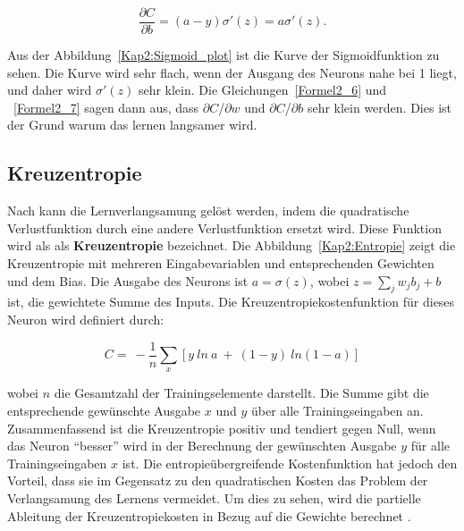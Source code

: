         \begin{equation} \label{Formel2_7}
            \frac{\partial C}{\partial b} =( a-y) \sigma '( z) =a\sigma '( z).
        \end{equation}
        
        Aus der Abbildung~\ref{Kap2:Sigmoid_plot} ist die Kurve der Sigmoidfunktion zu sehen. Die Kurve wird sehr flach, wenn der Ausgang des Neurons nahe bei 1 liegt, und daher wird $\sigma'(z)$ sehr klein. Die Gleichungen~\ref{Formel2_6} und ~\ref{Formel2_7} sagen dann aus, dass $\partial$$C$/$\partial$$w$  und  $\partial$$C$/$\partial$$b$ sehr klein werden. Dies ist der Grund warum das lernen langsamer wird.

    \subsection{Kreuzentropie}
    Nach \cite*[62]{Nielsen2015} kann die Lernverlangsamung gelöst werden, indem die quadratische Verlustfunktion durch eine andere Verlustfunktion ersetzt wird. Diese Funktion wird als als \textbf{Kreuzentropie} bezeichnet. Die Abbildung~\ref{Kap2:Entropie} zeigt die Kreuzentropie mit mehreren Eingabevariablen und entsprechenden Gewichten und dem Bias. Die Ausgabe des Neurons ist $a = \sigma(z)$, wobei $z =  \sum _{j} w_{j} b_{j} + b$ ist, die gewichtete Summe des Inputs. Die Kreuzentropiekostenfunktion für dieses Neuron wird definiert durch:

    \begin{equation} \label{Formel2_8}
        C=\ -\frac{1}{n}\sum _{x}[ y\ ln\ a\ +\ ( 1-y) \ ln( 1-a)]
    \end{equation}

    wobei $n$ die Gesamtzahl der Trainingselemente darstellt. Die Summe gibt die entsprechende gewünschte Ausgabe $x$ und $y$ über alle Trainingseingaben an. Zusammenfassend ist die Kreuzentropie positiv und tendiert gegen Null, wenn das Neuron
    \enquote{besser} wird in der Berechnung der gewünschten Ausgabe $y$ für alle Trainingseingaben $x$ ist.  Die entropieübergreifende Kostenfunktion hat jedoch den Vorteil, dass sie im Gegensatz zu den quadratischen Kosten das Problem der Verlangsamung des Lernens vermeidet. Um dies zu sehen, wird die partielle Ableitung der Kreuzentropiekosten in Bezug auf die Gewichte berechnet \cite*[63]{Nielsen2015}.


